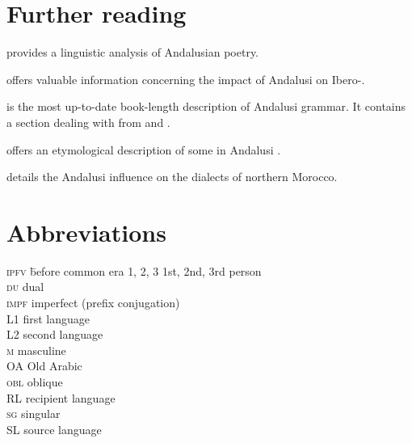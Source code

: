 \documentclass[output=paper,modfonts,nonflat]{langsci/langscibook}
\begin{document}
\section*{Further reading}
\begin{furtherreading}
\item[\citet{Corriente1997poetry}] provides a linguistic analysis of Andalusian  poetry.
\item[\citet{Corriente2005}] offers valuable information concerning the impact of Andalusi  on Ibero-.
\item[\citet{CorrientePereiraVicente2015}] is the most up-to-date book-length description of Andalusi  grammar. It contains a section dealing with  from  and . 
\item[\citet{Ferrando1997}] offers an etymological description of some   in Andalusi . 
\item[\citet{Vicente2010}] details the Andalusi influence on the dialects of northern Morocco. 
\end{furtherreading}


\section*{Abbreviations}
\begin{multicols}{2}
\begin{tabbing}
\textsc{ipfv} \hspace{1em} \= before common era\kill
\textsc{1, 2, 3} \> 1st, 2nd, 3rd person \\
\textsc{du} \> dual \\
\textsc{impf} \> imperfect (prefix conjugation) \\
L1 \> first language \\
L2 \> second language \\
\textsc{m} \> masculine \\
OA \> {Old} {Arabic} \\
\textsc{obl} \> oblique \\
{RL} \> {recipient language} \\
\textsc{sg} \> singular \\
{SL} \> {source language}
\end{tabbing}
\end{multicols}



\sloppy\printbibliography[heading=subbibliography,notkeyword=this]
\end{document}
